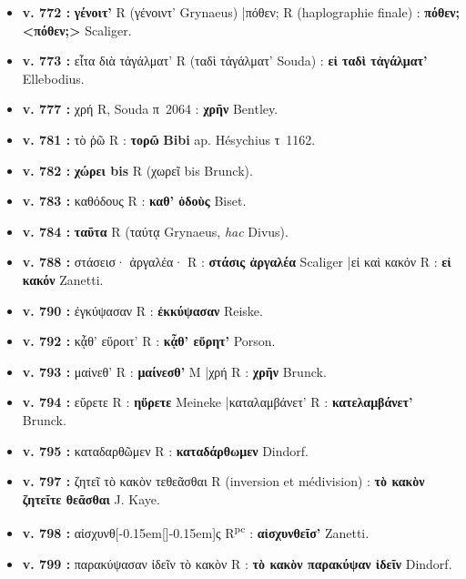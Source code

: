 \documentclass[10pt, a4paper, twoside]{book}
\renewcommand{\_}{\origunderscore\penalty0\relax}
\providecommand{\italique}[1]{\emph{#1}}
\providecommand{\lecon}[1]{\textbf{#1}}
\providecommand{\expo}[1]{\textsuperscript{#1}}
\providecommand{\Rpc}{R\expo{pc}}
\providecommand{\Mon}{M}
\providecommand{\espApp}{\hspace{0.5em}|\hspace{0.5em}}
\providecommand{\inRas}[2]{[\kern-0.15em[\text{#1}]\kern-0.15em]\text{#2}}
\begin{document}
\begin{itemize}
\begin{itemize}
    \item \textbf{v. 772 :} \lecon{γένοιτ'} R (γένοιντ' Grynaeus) \espApp πόθεν; R (haplographie finale) : \lecon{πόθεν; <πόθεν;>} Scaliger.
    \item \textbf{v. 773 :} εἶτα διὰ τἀγάλματ' R (ταδὶ τἀγάλματ' Souda) : \lecon{εἰ ταδὶ τἀγάλματ'} Ellebodius.
    \item \textbf{v. 777 :} χρή R, Souda π~2064 : \lecon{χρῆν} Bentley.
    \item \textbf{v. 781 :} τὸ ῥῶ R : \lecon{τορῶ} \lecon{Bibi} ap. Hésychius τ~1162.
    \item \textbf{v. 782 :} \textbf{χώρει bis} R (χωρεῖ bis Brunck).
    \item \textbf{v. 783 :} καθόδους R : \lecon{καθ' ὁδοὺς} Biset.
    \item \textbf{v. 784 :} \lecon{ταῦτα} R (ταύτᾳ Grynaeus, \italique{hac} Divus).
    \item \textbf{v. 788 :} στάσεισ· ἀργαλέα· R : \lecon{στάσις ἀργαλέα} Scaliger \espApp εἰ καὶ κακόν R : \lecon{εἰ κακόν} Zanetti.
    \item \textbf{v. 790 :} ἐγκύψασαν R : \lecon{ἐκκύψασαν} Reiske.
    \item \textbf{v. 792 :} κᾆθ' εὕροιτ' R : \lecon{κᾆθ' εὕρητ'} Porson.
    \item \textbf{v. 793 :} μαίνεθ' R : \lecon{μαίνεσθ'} \Mon{} \espApp χρή R : \lecon{χρῆν} Brunck.
    \item \textbf{v. 794 :} εὕρετε R : \lecon{ηὕρετε} Meineke \espApp καταλαμβάνετ' R : \lecon{κατελαμβάνετ'} Brunck.
    \item \textbf{v. 795 :} καταδαρθῶμεν R : \lecon{καταδάρθωμεν} Dindorf.
    \item \textbf{v. 797 :} ζητεῖ τὸ κακὸν τεθεᾶσθαι R (inversion et médivision) : \lecon{τὸ κακὸν ζητεῖτε θεᾶσθαι} J. Kaye.
    \item \textbf{v. 798 :} αἰσχυνθ\inRas{η}{εὶ}ς \Rpc{} : \lecon{αἰσχυνθεῖσ'} Zanetti.
    \item \textbf{v. 799 :} παρακύψασαν ἰδεῖν τὸ κακὸν R : \lecon{τὸ κακὸν παρακύψαν ἰδεῖν} Dindorf.
  \end{itemize}
\end{itemize}
\end{document}
